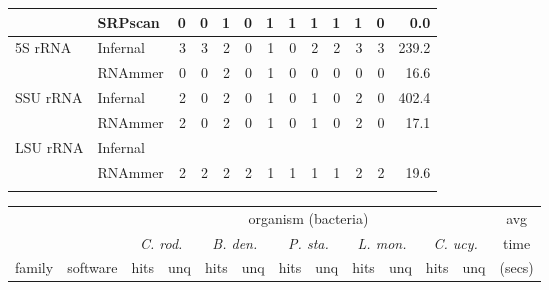 \begin{footnotesize}
\begin{table}
\begin{center}
\begin{tabular}{|l|l|rr|rr|rr|rr|rr|r|}
                 &  SRPscan          &    0 &   0 &    1 &   0 &    1 &   1 &    1 &   1 &    1 &   0 &   0.0  \\ \hline
5S rRNA          &  Infernal         &    3 &   3 &    2 &   0 &    1 &   0 &    2 &   2 &    3 &   3 & 239.2  \\ 
                 &  RNAmmer          &    0 &   0 &    2 &   0 &    1 &   0 &    0 &   0 &    0 &   0 &  16.6  \\ \hline
SSU rRNA         &  Infernal         &    2 &   0 &    2 &   0 &    1 &   0 &    1 &   0 &    2 &   0 & 402.4  \\ 
                 &  RNAmmer          &    2 &   0 &    2 &   0 &    1 &   0 &    1 &   0 &    2 &   0 &  17.1  \\ \hline
LSU rRNA         &  Infernal         &      &     &      &     &      &     &      &     &      &     &        \\ 
                 &  RNAmmer          &    2 &   2 &    2 &   2 &    1 &   1 &    1 &   1 &    2 &   2 &  19.6  \\ \hline
\multicolumn{12}{c}{} \\ 
\end{tabular}
\begin{tabular}{|l|l|rr|rr|rr|rr|rr|r|}
\multicolumn{1}{c}{} & \multicolumn{1}{c}{} &  \multicolumn{10}{c}{organism (bacteria)}   & \multicolumn{1}{c}{avg} \\ \cline{3-12}
\multicolumn{1}{c}{}  &  \multicolumn{1}{c|}{}  &  \multicolumn{2}{c|}{\emph{C. rod.}}  &  \multicolumn{2}{c|}{\emph{B. den.}}  &  \multicolumn{2}{c|}{\emph{P. sta.}}  &  \multicolumn{2}{c|}{\emph{L. mon.}}  &  \multicolumn{2}{c|}{\emph{C. ucy.}}   & \multicolumn{1}{c}{time} \\ 
\multicolumn{1}{c}{family}  &  \multicolumn{1}{c|}{software}  &  hits & unq &  hits & unq &  hits & unq &  hits & unq &  hits & unq  & \multicolumn{1}{c}{(secs)} \\ \hline 

\end{tabular}
\end{center}
\end{table}
\end{footnotesize}
